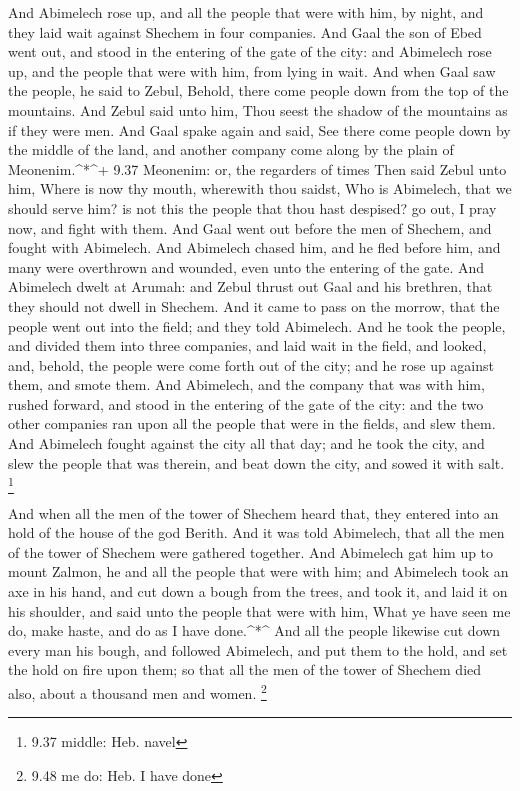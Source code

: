  And Abimelech rose up, and all the people that were with
him, by night, and they laid wait against Shechem in four companies.
 And Gaal the son of Ebed went out, and stood in the
entering of the gate of the city: and Abimelech rose up, and the people
that were with him, from lying in wait.  And when Gaal saw
the people, he said to Zebul, Behold, there come people down from the
top of the mountains. And Zebul said unto him, Thou seest the shadow of
the mountains as if they were men.  And Gaal spake again
and said, See there come people down by the middle of the land, and
another company come along by the plain of Meonenim.\^{}*\^{}+ 9.37
Meonenim: or, the regarders of times  Then said Zebul unto
him, Where is now thy mouth, wherewith thou saidst, Who is Abimelech,
that we should serve him? is not this the people that thou hast
despised? go out, I pray now, and fight with them.  And
Gaal went out before the men of Shechem, and fought with Abimelech.
 And Abimelech chased him, and he fled before him, and many
were overthrown and wounded, even unto the entering of the gate.
 And Abimelech dwelt at Arumah: and Zebul thrust out Gaal
and his brethren, that they should not dwell in Shechem. 
And it came to pass on the morrow, that the people went out into the
field; and they told Abimelech.  And he took the people,
and divided them into three companies, and laid wait in the field, and
looked, and, behold, the people were come forth out of the city; and he
rose up against them, and smote them.  And Abimelech, and
the company that was with him, rushed forward, and stood in the entering
of the gate of the city: and the two other companies ran upon all the
people that were in the fields, and slew them.  And
Abimelech fought against the city all that day; and he took the city,
and slew the people that was therein, and beat down the city, and sowed
it with salt. \footnote{9.37 middle: Heb. navel}

 And when all the men of the tower of Shechem heard that,
they entered into an hold of the house of the god Berith. 
And it was told Abimelech, that all the men of the tower of Shechem were
gathered together.  And Abimelech gat him up to mount
Zalmon, he and all the people that were with him; and Abimelech took an
axe in his hand, and cut down a bough from the trees, and took it, and
laid it on his shoulder, and said unto the people that were with him,
What ye have seen me do, make haste, and do as I have done.\^{}*\^{}
 And all the people likewise cut down every man his bough,
and followed Abimelech, and put them to the hold, and set the hold on
fire upon them; so that all the men of the tower of Shechem died also,
about a thousand men and women. \footnote{9.48 me do: Heb. I have done}

